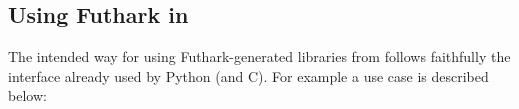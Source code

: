 
  
%

\subsection{Using Futhark in \csharp{}}

The intended way for using Futhark-generated libraries from \csharp{}
follows faithfully the interface already used by Python (and C). 
For example a use case is described below: 

